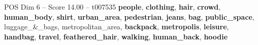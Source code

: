 \begin{textsample}{POS Dim 6 – Score 14.00 – t007535}  \label{ex:f6_pos_035}
\textbf{people}, \textbf{clothing}, \textbf{hair}, \textbf{crowd}, \textbf{human\_body}, \textbf{shirt}, \textbf{urban\_area}, \textbf{pedestrian}, \textbf{jeans}, \textbf{bag}, \textbf{public\_space}, luggage\_\&\_bags, metropolitan\_area, \textbf{backpack}, \textbf{metropolis}, \textbf{leisure}, \textbf{handbag}, \textbf{travel}, \textbf{feathered\_hair}, \textbf{walking}, \textbf{human\_back}, \textbf{hoodie}

\end{textsample}
